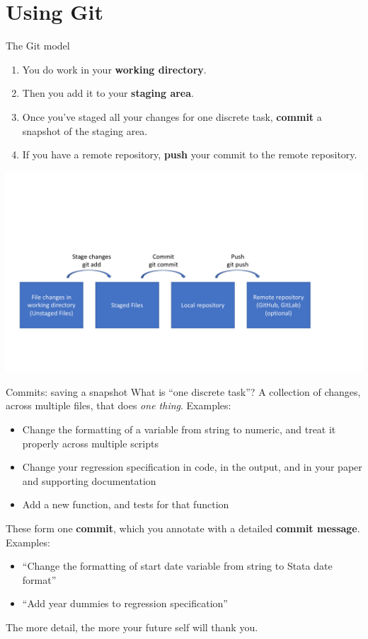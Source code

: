 \documentclass{beamer}
\begin{document}
\section{Using Git}

\begin{frame}{The Git model}

\begin{enumerate}
\item You do work in your \textbf{working directory}.
\item Then you add it to your \textbf{staging area}.
\item Once you've staged all your changes for one discrete task, \textbf{commit} a snapshot of the staging area.
\item If you have a remote repository, \textbf{push} your commit to the remote repository.
\end{enumerate}

\includegraphics[width=\textwidth]{git-model.pdf}
\end{frame}

\begin{frame}{Commits: saving a snapshot}
What is ``one discrete task''? A collection of changes, across multiple files, that does \textit{one thing}. Examples:
\begin{itemize}
\item Change the formatting of a variable from string to numeric, and treat it properly across multiple scripts
\item Change your regression specification in code, in the output, and in your paper and supporting documentation
\item Add a new function, and tests for that function
\end{itemize}
These form one \textbf{commit}, which you annotate with a detailed \textbf{commit message}. Examples:
\begin{itemize}
\item ``Change the formatting of start date variable from string to Stata date format''
\item ``Add year dummies to regression specification''
\end{itemize}
The more detail, the more your future self will thank you.
\end{frame}
\end{document}
